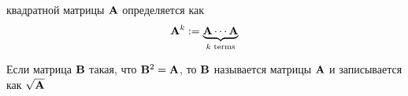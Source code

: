 \begin{frame}

    \vspace{2em}
     квадратной матрицы $\mathbf A$ определяется как
    \begin{equation*}
        \mathbf A^k := \underbrace{\mathbf A \cdots \mathbf A}_{k \text{ terms}} 
    \end{equation*}
    
    \vspace{.7em}
    Если матрица $\mathbf B$ такая, что $\mathbf B^2 = \mathbf A$, то $\mathbf B$
    называется  матрицы $\mathbf A$ и записывается как $\sqrt{\mathbf A}$
    
\end{frame}

\begin{frame}


\end{frame}
